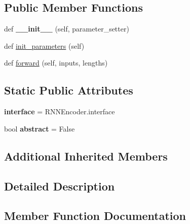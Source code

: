 \subsection*{Public Member Functions}
\begin{DoxyCompactItemize}
\item 
def {\bfseries \+\_\+\+\_\+init\+\_\+\+\_\+} (self, parameter\+\_\+setter)\hypertarget{classrnn_1_1UnidirectionalRNNEncoder_ace467be7238bdc9a10badcb3bce9b7fe}{}\label{classrnn_1_1UnidirectionalRNNEncoder_ace467be7238bdc9a10badcb3bce9b7fe}

\item 
def \hyperlink{classrnn_1_1UnidirectionalRNNEncoder_ad05f8983c292ef6a901743e8976c7a5b}{init\+\_\+parameters} (self)
\item 
def \hyperlink{classrnn_1_1UnidirectionalRNNEncoder_af2e291518039e9c1b36c6660498ef655}{forward} (self, inputs, lengths)
\end{DoxyCompactItemize}
\subsection*{Static Public Attributes}
\begin{DoxyCompactItemize}
\item 
{\bfseries interface} = R\+N\+N\+Encoder.\+interface\hypertarget{classrnn_1_1UnidirectionalRNNEncoder_a78711f48a83a155c4b8cb85a394893fc}{}\label{classrnn_1_1UnidirectionalRNNEncoder_a78711f48a83a155c4b8cb85a394893fc}

\item 
bool {\bfseries abstract} = False\hypertarget{classrnn_1_1UnidirectionalRNNEncoder_abb6520d522683e30d53e5e80ec86d55f}{}\label{classrnn_1_1UnidirectionalRNNEncoder_abb6520d522683e30d53e5e80ec86d55f}

\end{DoxyCompactItemize}
\subsection*{Additional Inherited Members}


\subsection{Detailed Description}
\begin{DoxyVerb}\end{DoxyVerb}
 

\subsection{Member Function Documentation}

